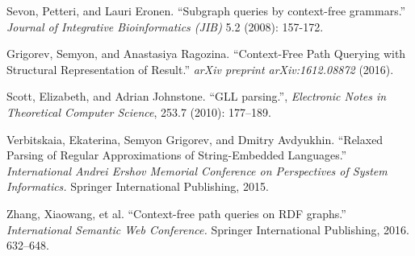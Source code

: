 \documentclass[12pt]{article}  %
\theoremstyle{definition}
\theoremstyle{remark}
\begin{document}
\begin{thebibliography}{9}


  Sevon, Petteri, and Lauri Eronen.
  ``Subgraph queries by context-free grammars.''
  \emph{Journal of Integrative Bioinformatics (JIB)}
  5.2 (2008): 157-172.

  Grigorev, Semyon, and Anastasiya Ragozina. 
  ``Context-Free Path Querying with Structural Representation of Result.''
   \emph{arXiv preprint arXiv:1612.08872}
    (2016).

  Scott, Elizabeth, and Adrian Johnstone.   
  ``GLL parsing.'',
  \emph{Electronic Notes in Theoretical Computer Science},
  253.7 (2010): 177--189.

  Verbitskaia, Ekaterina, Semyon Grigorev, and Dmitry Avdyukhin.
  ``Relaxed Parsing of Regular Approximations of String-Embedded Languages.''
  \emph{International Andrei Ershov Memorial Conference on Perspectives of System Informatics.}
  Springer International Publishing, 2015.

  Zhang, Xiaowang, et al.
  ``Context-free path queries on RDF graphs.'' 
  \emph{International Semantic Web Conference.}
   Springer International Publishing, 2016.
   632--648.

\end{thebibliography}
\end{document}
